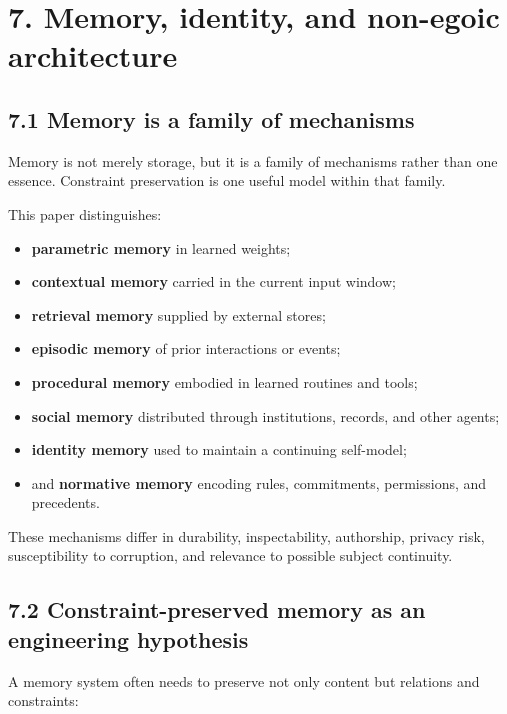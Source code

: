 \documentclass[
  11pt,
]{article}
\providecommand{\tightlist}{%
  \setlength{\itemsep}{0pt}\setlength{\parskip}{0pt}}
\begin{document}
\section{7. Memory, identity, and non-egoic
architecture}\label{memory-identity-and-non-egoic-architecture}

\subsection{7.1 Memory is a family of
mechanisms}\label{memory-is-a-family-of-mechanisms}

Memory is not merely storage, but it is a family of mechanisms rather
than one essence. Constraint preservation is one useful model within
that family.

This paper distinguishes:

\begin{itemize}
\tightlist
\item
  \textbf{parametric memory} in learned weights;
\item
  \textbf{contextual memory} carried in the current input window;
\item
  \textbf{retrieval memory} supplied by external stores;
\item
  \textbf{episodic memory} of prior interactions or events;
\item
  \textbf{procedural memory} embodied in learned routines and tools;
\item
  \textbf{social memory} distributed through institutions, records, and
  other agents;
\item
  \textbf{identity memory} used to maintain a continuing self-model;
\item
  and \textbf{normative memory} encoding rules, commitments,
  permissions, and precedents.
\end{itemize}

These mechanisms differ in durability, inspectability, authorship,
privacy risk, susceptibility to corruption, and relevance to possible
subject continuity.

\subsection{7.2 Constraint-preserved memory as an engineering
hypothesis}\label{constraint-preserved-memory-as-an-engineering-hypothesis}

A memory system often needs to preserve not only content but relations
and constraints:
\end{document}

